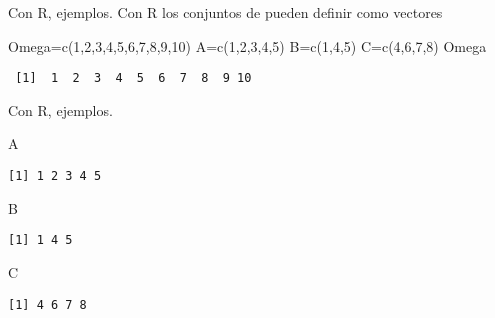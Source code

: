 \documentclass[
  ignorenonframetext,
  aspectratio=169]{beamer}
\newenvironment{Shaded}{\begin{snugshade}}{\end{snugshade}}
\newcommand{\DecValTok}[1]{\textcolor[rgb]{0.68,0.00,0.00}{#1}}
\newcommand{\FunctionTok}[1]{\textcolor[rgb]{0.28,0.35,0.67}{#1}}
\newcommand{\NormalTok}[1]{\textcolor[rgb]{0.00,0.23,0.31}{#1}}
\newcommand{\OtherTok}[1]{\textcolor[rgb]{0.00,0.23,0.31}{#1}}
\begin{document}
\begin{frame}[fragile]{Con R, ejemplos.}
\protect\hypertarget{con-r-ejemplos.}{}
Con R los conjuntos de pueden definir como vectores

\begin{Shaded}
\begin{Highlighting}[]
\NormalTok{Omega}\OtherTok{=}\FunctionTok{c}\NormalTok{(}\DecValTok{1}\NormalTok{,}\DecValTok{2}\NormalTok{,}\DecValTok{3}\NormalTok{,}\DecValTok{4}\NormalTok{,}\DecValTok{5}\NormalTok{,}\DecValTok{6}\NormalTok{,}\DecValTok{7}\NormalTok{,}\DecValTok{8}\NormalTok{,}\DecValTok{9}\NormalTok{,}\DecValTok{10}\NormalTok{)}
\NormalTok{A}\OtherTok{=}\FunctionTok{c}\NormalTok{(}\DecValTok{1}\NormalTok{,}\DecValTok{2}\NormalTok{,}\DecValTok{3}\NormalTok{,}\DecValTok{4}\NormalTok{,}\DecValTok{5}\NormalTok{)}
\NormalTok{B}\OtherTok{=}\FunctionTok{c}\NormalTok{(}\DecValTok{1}\NormalTok{,}\DecValTok{4}\NormalTok{,}\DecValTok{5}\NormalTok{)}
\NormalTok{C}\OtherTok{=}\FunctionTok{c}\NormalTok{(}\DecValTok{4}\NormalTok{,}\DecValTok{6}\NormalTok{,}\DecValTok{7}\NormalTok{,}\DecValTok{8}\NormalTok{)}
\NormalTok{Omega}
\end{Highlighting}
\end{Shaded}

\begin{verbatim}
 [1]  1  2  3  4  5  6  7  8  9 10
\end{verbatim}
\end{frame}

\begin{frame}[fragile]{Con R, ejemplos.}
\protect\hypertarget{con-r-ejemplos.-1}{}
\begin{Shaded}
\begin{Highlighting}[]
\NormalTok{A}
\end{Highlighting}
\end{Shaded}

\begin{verbatim}
[1] 1 2 3 4 5
\end{verbatim}

\begin{Shaded}
\begin{Highlighting}[]
\NormalTok{B}
\end{Highlighting}
\end{Shaded}

\begin{verbatim}
[1] 1 4 5
\end{verbatim}

\begin{Shaded}
\begin{Highlighting}[]
\NormalTok{C}
\end{Highlighting}
\end{Shaded}

\begin{verbatim}
[1] 4 6 7 8
\end{verbatim}
\end{frame}
\end{document}
